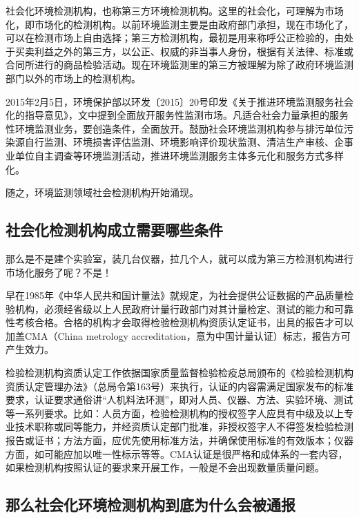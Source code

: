 \documentclass[]{book}
\begin{document}
社会化环境检测机构，也称第三方环境检测机构。这里的社会化，可理解为市场化，即市场化的检测机构。以前环境监测主要是由政府部门承担，现在市场化了，可以在检测市场上自由选择；第三方检测机构，最初是用来称呼公正检验的，由处于买卖利益之外的第三方，以公正、权威的非当事人身份，根据有关法律、标准或合同所进行的商品检验活动。现在环境监测里的第三方被理解为除了政府环境监测部门以外的市场上的检测机构。

2015年2月5日，环境保护部以环发〔2015〕20号印发《关于推进环境监测服务社会化的指导意见》，文中提到全面放开服务性监测市场。凡适合社会力量承担的服务性环境监测业务，要创造条件，全面放开。鼓励社会环境监测机构参与排污单位污染源自行监测、环境损害评估监测、环境影响评价现状监测、清洁生产审核、企事业单位自主调查等环境监测活动，推进环境监测服务主体多元化和服务方式多样化。

随之，环境监测领域社会检测机构开始涌现。

\hypertarget{ux793eux4f1aux5316ux68c0ux6d4bux673aux6784ux6210ux7acbux9700ux8981ux54eaux4e9bux6761ux4ef6}{%
\subsection{社会化检测机构成立需要哪些条件}\label{ux793eux4f1aux5316ux68c0ux6d4bux673aux6784ux6210ux7acbux9700ux8981ux54eaux4e9bux6761ux4ef6}}

那么是不是建个实验室，装几台仪器，拉几个人，就可以成为第三方检测机构进行市场化服务了呢？不是！

早在1985年《中华人民共和国计量法》就规定，为社会提供公证数据的产品质量检验机构，必须经省级以上人民政府计量行政部门对其计量检定、测试的能力和可靠性考核合格。合格的机构才会取得检验检测机构资质认定证书，出具的报告才可以加盖CMA（China metrology accreditation，意为中国计量认证）标志，报告方可产生效力。

检验检测机构资质认定工作依据国家质量监督检验检疫总局颁布的《检验检测机构资质认定管理办法》（总局令第163号）来执行，认证的内容需满足国家发布的标准要求，认证要求通俗讲``人机料法环测''，即对人员、仪器、方法、实验环境、测试等一系列要求。比如：人员方面，检验检测机构的授权签字人应具有中级及以上专业技术职称或同等能力，并经资质认定部门批准，非授权签字人不得签发检验检测报告或证书；方法方面，应优先使用标准方法，并确保使用标准的有效版本；仪器方面，如可能应加以唯一性标示等等。CMA认证是很严格和成体系的一套内容，如果检测机构按照认证的要求来开展工作，一般是不会出现数量质量问题。

\hypertarget{ux90a3ux4e48ux793eux4f1aux5316ux73afux5883ux68c0ux6d4bux673aux6784ux5230ux5e95ux4e3aux4ec0ux4e48ux4f1aux88abux901aux62a5}{%
\subsection{那么社会化环境检测机构到底为什么会被通报}\label{ux90a3ux4e48ux793eux4f1aux5316ux73afux5883ux68c0ux6d4bux673aux6784ux5230ux5e95ux4e3aux4ec0ux4e48ux4f1aux88abux901aux62a5}}
\end{document}
